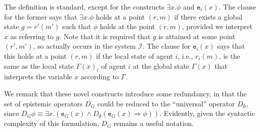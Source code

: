\documentclass[a4wide]{article}
\theoremstyle{examplesty}
\newcommand{\I}{\mathcal{I}}
\newcommand{\existsg}[1]{\exists #1.}
\newcommand{\lid}[2]{\mathtt{e}_{#1}(#2)}
\newcommand{\rimp}{\Rightarrow}
\newcommand{\Cont}{\Gamma}
\begin{document}
The definition is standard, except for the constructs  $\existsg{x}\phi$ and $\lid{i}{x}$. 
The clause for the former says that $\existsg{x}\phi$ holds at a point $(r,m)$ if 
there exists a global state $g=r'(m')$ such  
that  $\phi$ holds at the  point $(r,m)$, 
provided we interpret $x$ as 
referring to $g$. Note that it is required that $g$ is attained at some point $(r',m')$, 
so actually occurs in the system $\I$. 
The clause for $\lid{i}{x}$ says that this holds at a point 
$(r,m)$ if the local state of agent $i$, 
i.e., $r_i(m)$, 
is the same as the 
local state $\Cont(x)_i$ of agent $i$ at the global state $\Cont(x)$ 
that interprets the variable $x$ according to $\Cont$. 


We remark that these novel constructs introduce some redundancy, in that
the set of epistemic operators $D_G$ could be reduced to the ``universal'' operator $D_\emptyset$, 
since  $ D_G\phi \equiv \existsg{x} (\lid{G}{x} \land D_\emptyset (\lid{G}{x} \rimp \phi))$. 
Evidently, given the syntactic complexity of this formulation,  $D_G$ remains a useful notation.  
\end{document}
